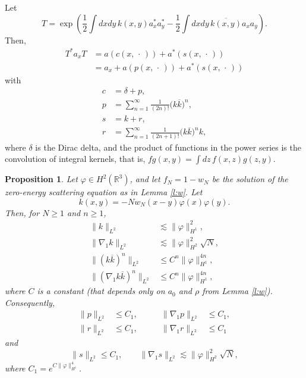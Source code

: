 \documentclass[a4paper,11pt]{article}
\newtheorem{prop}{Proposition}
\newcommand{\R}{\mathds{R}}
\begin{document}
Let
\begin{displaymath}
  T = \exp \left( \frac{1}{2} \int dxdy \, k(x,y) a_x^* a_y^* - \frac{1}{2}
  \int dxdy \, \overline{k(x,y)} a_x a_y \right).
\end{displaymath}
Then,
\begin{align*}
  T^* a_x T & = a(c(x,\,\cdot\,)) + a^*(s(x,\,\cdot\,)) \\
  & = a_x + a(p(x,\,\cdot\,)) + a^*(s(x,\,\cdot\,))
\end{align*}
with
\begin{align*}
  c & = \delta + p, \\
  p & = \sum_{n=1}^\infty \frac{1}{(2n)!} \big( k \overline{k} \big)^n, \\
  s & = k + r, \\
  r & = \sum_{n=1}^\infty \frac{1}{(2n+1)!} \big( k \overline{k} \big)^n k,
\end{align*}
where $\delta$ is the Dirac delta, and the product of functions in the power
series is the convolution of integral kernels, that is, $fg(x,y) = \int dz \,
f(x,z) g(z,y)$.


\begin{prop}
  \label{p:psr}
  Let $\varphi \in H^2(\R^3)$, and let $f_N=1-w_N$ be the solution of the
  zero-energy scattering equation as in Lemma \ref{l:w}. Let
  \begin{displaymath}
    k(x,y) = - N w_N(x-y) \varphi(x) \varphi(y).
  \end{displaymath}
  Then, for $N \ge 1$ and $n \ge 1$,
  \begin{align}
    \| k \|_{L^2} & \apprle \| \varphi \|_{H^1}^2, \label{k} \tag{i} \\
    \| \nabla_1 k \|_{L^2} & \apprle \| \varphi \|_{H^2}^2 \sqrt{N},
    \label{gradk} \tag{ii} \\
    \| (k \overline{k})^n \|_{L^2} & \le C^n \| \varphi \|_{H^1}^{4n},
    \tag{iii} \\
    \| (\nabla_1 k \overline{k})^n \|_{L^2} & \le C^n \| \varphi
    \|_{H^1}^{4n}, \tag{iv}
  \end{align}
  where $C$ is a constant (that depends only on $a_0$ and $\rho$ from Lemma
  \ref{l:w}). Consequently,
  \begin{equation}
    \begin{alignedat}{2}
      \| p \|_{L^2} & \le C_1, \qquad & \| \nabla_1 p \|_{L^2} & \le C_1, \\
      \| r \|_{L^2} & \le C_1, \qquad & \| \nabla_1 r \|_{L^2} & \le C_1
    \end{alignedat}
    \tag{v}
  \end{equation}
  and
  \begin{equation}
    \| s \|_{L^2} \le C_1, \qquad \| \nabla_1 s \|_{L^2} \apprle \| \varphi
    \|_{H^2}^2 \sqrt{N}, \tag{vi}
  \end{equation}
  where $C_1 = e^{C \| \varphi \|_{H^1}^4}$.
\end{prop}
\end{document}
